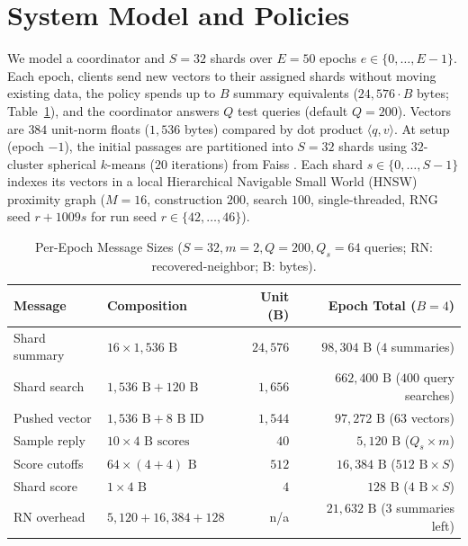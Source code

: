 \section{System Model and Policies}
\label{sec:system}

We model a coordinator and $S = 32$ shards over $E = 50$ epochs $e \in \{0, \dots, E-1\}$. Each epoch, clients send new vectors to their assigned shards without moving existing data, the policy spends up to $B$ summary equivalents ($24{,}576 \cdot B$ bytes; Table~\ref{tab:byte_accounting}), and the coordinator answers $Q$ test queries (default $Q = 200$). Vectors are $384$ unit-norm floats ($1{,}536$ bytes) compared by dot product $\langle q, v \rangle$. At setup (epoch $-1$), the initial passages are partitioned into $S = 32$ shards using $32$-cluster spherical $k$-means ($20$ iterations) from Faiss \cite{douze2024faiss}. Each shard $s \in \{0, \dots, S-1\}$ indexes its vectors in a local Hierarchical Navigable Small World (HNSW) proximity graph \cite{malkov2020hnsw} ($M = 16$, construction $200$, search $100$, single-threaded, RNG seed $r + 1009 s$ for run seed $r \in \{42, \dots, 46\}$).

\begin{table}[!t]
\centering
\caption{Per-Epoch Message Sizes ($S{=}32, m{=}2, Q{=}200, Q_s{=}64$ queries; RN: recovered-neighbor; B: bytes).}
\label{tab:byte_accounting}
\scriptsize
\renewcommand{\arraystretch}{0.68}
\setlength{\tabcolsep}{2.2pt}
\begin{tabular}{@{}llrr@{}}
\toprule
\textbf{Message} & \textbf{Composition} & \textbf{Unit (B)} & \textbf{Epoch Total ($B{=}4$)} \\
\midrule
Shard summary & $16 \times 1,536\text{ B}$ & $24,576$ & $98,304\text{ B}$ ($4$ summaries) \\
Shard search & $1,536\text{ B} + 120\text{ B}$ & $1,656$ & $662,400\text{ B}$ ($400$ query searches) \\
Pushed vector & $1,536\text{ B} + 8\text{ B ID}$ & $1,544$ & $97,272\text{ B}$ ($63$ vectors) \\
Sample reply & $10 \times 4\text{ B scores}$ & $40$ & $5,120\text{ B}$ ($Q_s \times m$) \\
Score cutoffs & $64 \times (4 + 4)\text{ B}$ & $512$ & $16,384\text{ B}$ ($512\text{ B} \times S$) \\
Shard score & $1 \times 4\text{ B}$ & $4$ & $128\text{ B}$ ($4\text{ B} \times S$) \\
RN overhead & $5,120 + 16,384 + 128$ & n/a & $21,632\text{ B}$ ($3$ summaries left) \\
\bottomrule
\end{tabular}
\end{table}


